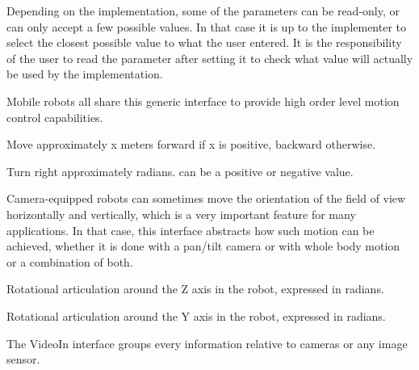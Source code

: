Depending on the implementation, some of the parameters can be read-only, or
can only accept a few possible values. In that case it is up to the implementer
to select the closest possible value to what the user entered. It is the
responsibility of the user to read the parameter after setting it to check
what value will actually be used by the implementation.



Mobile robots all share this generic interface to provide high order
level motion control capabilities.

\begin{slots}
  {%
    Move approximately x meters forward if x is positive, backward
    otherwise.%
  }

  {%
    Turn right approximately  radians.   can be a
    positive or negative value.%
  }

\end{slots}


Camera-equipped robots can sometimes move the orientation of the field
of view horizontally and vertically, which is a very important feature
for many applications. In that case, this interface abstracts how such
motion can be achieved, whether it is done with a pan/tilt camera or
with whole body motion or a combination of both.

\begin{slots}
  {%
    Rotational articulation around the Z axis in the robot, expressed
    in radians.%
  }

  {%
    Rotational articulation around the Y axis in the robot, expressed
    in radians.%
  }

\end{slots}


The VideoIn interface groups every information relative to cameras or any
image sensor.

